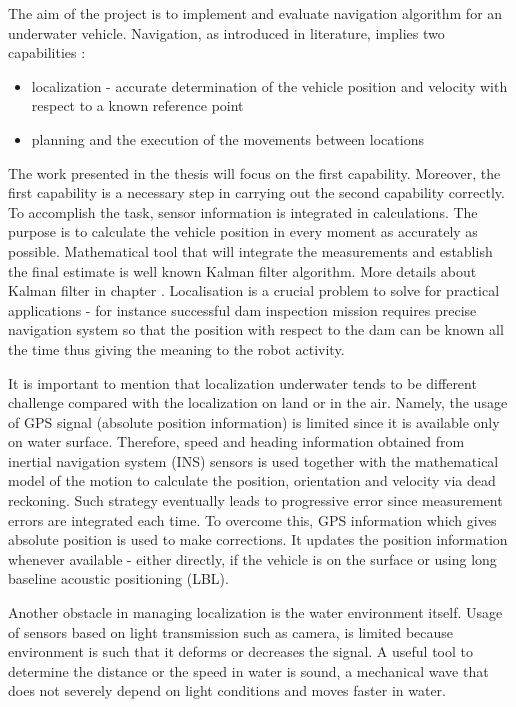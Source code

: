 The aim of the project is to implement and evaluate navigation algorithm for an underwater vehicle. Navigation, as introduced in literature, implies two capabilities \cite{farrell98}:
\begin{itemize}
\item localization - accurate determination of the vehicle position and velocity with respect to a known reference point
\item planning and the execution of the movements between locations   
\end{itemize} 
The work presented in the thesis will focus on the first capability. Moreover, the first capability is a necessary step in carrying out the second capability correctly. To accomplish the task, sensor information is integrated in calculations. The purpose is to calculate the vehicle position in every moment as accurately as possible. Mathematical tool that will integrate the measurements and establish the final estimate is well known Kalman filter \cite{kalman60} algorithm. More details about Kalman filter in chapter \label{chap:KalmanFilter}. Localisation is a crucial problem to solve for practical applications - for instance successful dam inspection mission requires precise navigation system so that the position with respect to the dam can be known all the time \cite{blain03} thus giving the meaning to the robot activity.

It is important to mention that localization underwater tends to be different challenge compared with the localization on land or in the air. Namely, the usage of GPS signal (absolute position information) is limited since it is available only on water surface. Therefore, speed and heading information obtained from inertial navigation system (INS) sensors is used together with the mathematical model of the motion to calculate the position, orientation and velocity via dead reckoning. Such strategy eventually leads to progressive error since measurement errors are integrated each time. To overcome this, GPS information which gives absolute position is used to make corrections. It updates the position information whenever available - either directly, if the vehicle is on the surface or using long baseline acoustic positioning (LBL).

Another obstacle in managing localization is the water environment itself. Usage of sensors based on light transmission such as camera, is limited because environment is such that it deforms or decreases the signal. A useful tool to determine the distance or the speed in water is sound, a mechanical wave that does not severely depend on light conditions and moves faster in water.  

